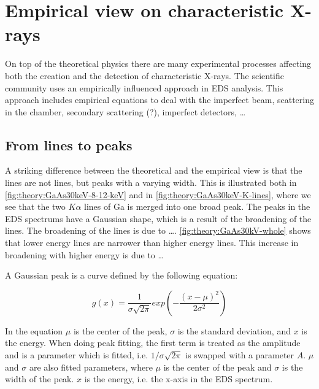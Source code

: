 




%
%
%
%
\section{Empirical view on characteristic X-rays}
\label{sec:theory:empirical}
On top of the theoretical physics there are many experimental processes affecting both the creation and the detection of characteristic X-rays.
The scientific community uses an empirically influenced approach in EDS analysis.
This approach includes empirical equations to deal with the imperfect beam, scattering in the chamber, secondary scattering (?), imperfect detectors, \dots


%
%
\subsection{From lines to peaks}
\label{sec:theory:empirical:peaks}
A striking difference between the theoretical and the empirical view is that the lines are not lines, but peaks with a varying width.
This is illustrated both in \cref{fig:theory:GaAs30keV-8-12-keV} and in \cref{fig:theory:GaAs30keV-K-lines}, where we see that the two $K\alpha$ lines of Ga is merged into one broad peak.
The peaks in the EDS spectrums have a Gaussian shape, which is a result of the broadening of the lines.
The broadening of the lines is due to \dots {}. %
\cref{fig:theory:GaAs30kV-whole} shows that lower energy lines are narrower than higher energy lines.
This increase in broadening with higher energy is due to \dots {}

A Gaussian peak is a curve defined by the following equation:

\begin{equation}
    \label{eq:theory:empirical:gaussian}
    g(x) = \frac{1}{\sigma \sqrt{2\pi}} exp({-\frac{(x-\mu)^2}{2\sigma^2}})
\end{equation}

In the equation $\mu$ is the center of the peak, $\sigma$ is the standard deviation, and $x$ is the energy.
When doing peak fitting, the first term is treated as the amplitude and is a parameter which is fitted, i.e. $1/\sigma\sqrt{2\pi}$ is swapped with a parameter $A$.
$\mu$ and $\sigma$ are also fitted parameters, where $\mu$ is the center of the peak and $\sigma$ is the width of the peak.
$x$ is the energy, i.e. the x-axis in the EDS spectrum.

